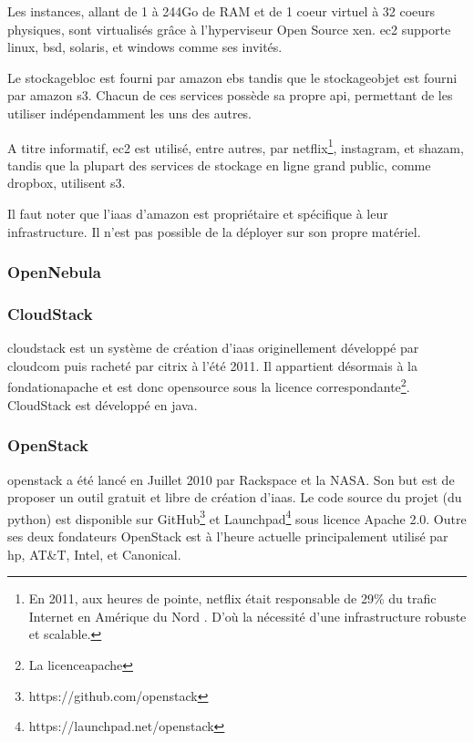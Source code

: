 \documentclass[a4paper,oneside]{report}
\begin{document}
Les instances, allant de 1 à 244Go de RAM et de 1 \gls{coeur} virtuel à 32 \glspl{coeur} physiques, sont virtualisés grâce à l'hyperviseur Open Source \gls{xen}.
\gls{ec2} supporte \gls{linux}, \gls{bsd}, \gls{solaris}, et \gls{windows} comme \glspl{se} invités.

Le \gls{stockagebloc} est fourni par \gls{amazon} \gls{ebs} tandis que le \gls{stockageobjet} est fourni par \gls{amazon} \gls{s3}.
Chacun de ces services possède sa propre \gls{api}, permettant de les utiliser indépendamment les uns des autres.

A titre informatif, \gls{ec2} est utilisé, entre autres, par \gls{netflix}\footnote{En 2011, aux heures de pointe, \gls{netflix} était responsable de 29\% du trafic Internet en Amérique du Nord \cite{NetflixTrafic}. D'où la nécessité d'une infrastructure robuste et scalable.}, \gls{instagram}, et \gls{shazam}, tandis que la plupart des services de stockage en ligne grand public, comme \gls{dropbox}, utilisent \gls{s3}.

Il faut noter que l'\gls{iaas} d'\gls{amazon} est propriétaire et spécifique à leur infrastructure. Il n'est pas possible de la déployer sur son propre matériel.

\subsubsection{OpenNebula}

\subsubsection{CloudStack}
\gls{cloudstack} est un système de création d'\gls{iaas} originellement développé par \gls{cloudcom} puis racheté par \gls{citrix} à l'été 2011.
Il appartient désormais à la \gls{fondationapache} et est donc \gls{opensource} sous la licence correspondante\footnote{La \gls{licenceapache}}.\newline
CloudStack est développé en \gls{java}.

\subsubsection{OpenStack}
\gls{openstack} a été lancé en Juillet 2010 par Rackspace et la NASA.
Son but est de proposer un outil gratuit et libre de création d'\gls{iaas}.
Le code source du projet (du \gls{python}) est disponible sur GitHub\footnote{https://github.com/openstack} et Launchpad\footnote{https://launchpad.net/openstack} sous licence Apache 2.0.\newline
Outre ses deux fondateurs OpenStack est à l'heure actuelle principalement utilisé par \gls{hp}, AT\&T, Intel, et Canonical.
\end{document}
